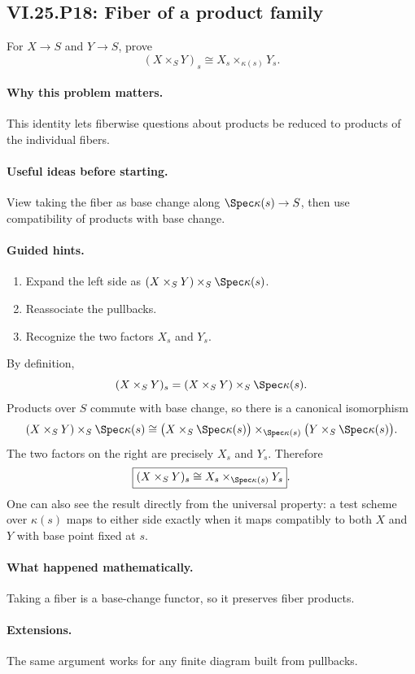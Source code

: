 \subsection*{VI.25.P18: Fiber of a product family}
\begin{problem}\label{prob:vi25-p18}
For \(X\to S\) and \(Y\to S\), prove
\[
(X\times_SY)_s\cong X_s\times_{\kappa(s)}Y_s.
\]
\end{problem}

\ifdefined\FullProblemDossiers
\paragraph{Why this problem matters.}
This identity lets fiberwise questions about products be reduced to products of the individual fibers.

\paragraph{Useful ideas before starting.}
View taking the fiber as base change along \(\Spec\kappa(s)\to S\), then use compatibility of products with base change.

\paragraph{Guided hints.}
\begin{enumerate}
\item Expand the left side as \((X\times_SY)\times_S\Spec\kappa(s)\).
\item Reassociate the pullbacks.
\item Recognize the two factors \(X_s\) and \(Y_s\).
\end{enumerate}

\begin{solution}
By definition,
\[
(X\times_SY)_s
=
(X\times_SY)\times_S\Spec\kappa(s).
\]
Products over \(S\) commute with base change, so there is a canonical isomorphism
\[
(X\times_SY)\times_S\Spec\kappa(s)
\cong
\bigl(X\times_S\Spec\kappa(s)\bigr)
\times_{\Spec\kappa(s)}
\bigl(Y\times_S\Spec\kappa(s)\bigr).
\]
The two factors on the right are precisely \(X_s\) and \(Y_s\).  Therefore
\[
\boxed{
(X\times_SY)_s
\cong
X_s\times_{\Spec\kappa(s)}Y_s
}.
\]
One can also see the result directly from the universal property: a test scheme over \(\kappa(s)\) maps to either side exactly when it maps compatibly to both \(X\) and \(Y\) with base point fixed at \(s\).
\end{solution}

\paragraph{What happened mathematically.}
Taking a fiber is a base-change functor, so it preserves fiber products.

\paragraph{Extensions.}
The same argument works for any finite diagram built from pullbacks.
\fi
